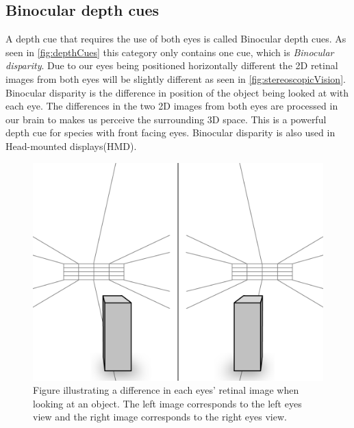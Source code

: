 \subsection{Binocular depth cues}\label{sec:binocularDepthCues}
A depth cue that requires the use of both eyes is called Binocular depth cues. As seen in \autoref{fig:depthCues} this category only contains one cue, which is \textit{Binocular disparity}. Due to our eyes being positioned horizontally different the 2D retinal images from both eyes will be slightly different as seen in \autoref{fig:stereoscopicVision}. Binocular disparity is the difference in position of the object being looked at with each eye\citep[p.~208]{sensationPerception}. The differences in the two 2D images from both eyes are processed in our brain to makes us perceive the surrounding 3D space. This is a powerful depth cue for species with front facing eyes\citep{seeingInThreeDimensions}. Binocular disparity is also used in Head-mounted displays(HMD)\citep{hmdCues}.
\begin{figure}[H]
	\centering
	\includegraphics[width=0.8\linewidth]{figure/Analysis/stereoScopicVision.png}
	\caption{Figure illustrating a difference in each eyes' retinal image when looking at an object. The left image corresponds to the left eyes view and the right image corresponds to the right eyes view.}
	\label{fig:stereoscopicVision}
\end{figure}


